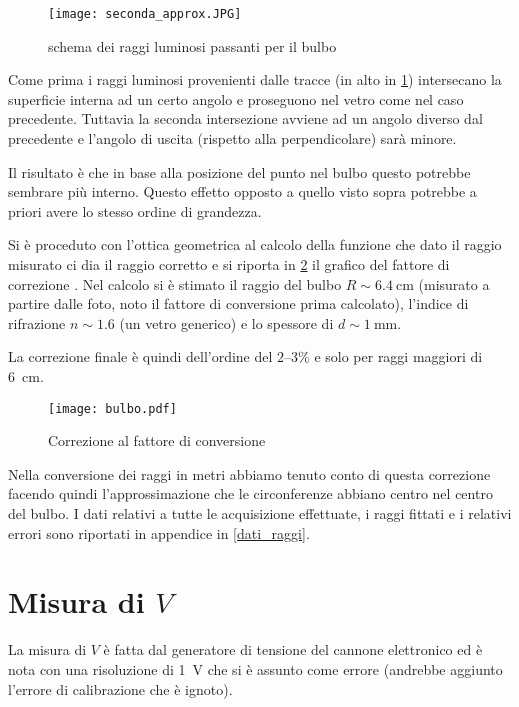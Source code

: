\begin{figure}[H]
	\centering
	\texttt{[image: seconda\_approx.JPG]}
	\caption{schema dei raggi luminosi passanti per il bulbo}
	\label{ottica2}
\end{figure}

Come prima i raggi luminosi provenienti dalle tracce (in alto in \figurename{ \ref{ottica2}}) intersecano la superficie interna ad un certo angolo e proseguono nel vetro come nel caso precedente. Tuttavia la seconda intersezione avviene ad un angolo diverso dal precedente e l'angolo di uscita (rispetto alla perpendicolare) sarà minore.

Il risultato è che in base alla posizione del punto nel bulbo questo potrebbe sembrare più interno. Questo effetto opposto a quello visto sopra potrebbe a priori avere lo stesso ordine di grandezza.

Si è proceduto con l'ottica geometrica al calcolo della funzione che dato il raggio misurato ci dia il raggio corretto e si riporta in \figurename{ \ref{bulbo}} il grafico del fattore di correzione . Nel calcolo si è stimato il raggio del bulbo $R \sim \SI{6.4}{\cm}$ (misurato a partire dalle foto, noto il fattore di conversione prima calcolato), l'indice di rifrazione $n \sim 1.6$ (un vetro generico) e lo spessore di $d \sim \SI{1}{\mm}$.

La correzione finale è quindi dell'ordine del $\SIrange{2}{3}\%$ e solo per raggi maggiori di \SI{6}{\cm}.

\begin{figure}[H]
	\centering
	\texttt{[image: bulbo.pdf]}
	\caption{Correzione al fattore di conversione}
	\label{bulbo}
\end{figure}

Nella conversione dei raggi in metri abbiamo tenuto conto di questa correzione facendo quindi l'approssimazione che le circonferenze abbiano centro nel centro del bulbo.
I dati relativi a tutte le acquisizione effettuate, i raggi fittati e i relativi errori sono riportati in appendice in \tablename{ \ref{dati_raggi}}.

\section{Misura di $V$}
La misura di $V$ è fatta dal generatore di tensione del cannone elettronico ed è nota con una risoluzione di \SI{1}{\volt} che si è assunto come errore (andrebbe aggiunto l'errore di calibrazione che è ignoto).

